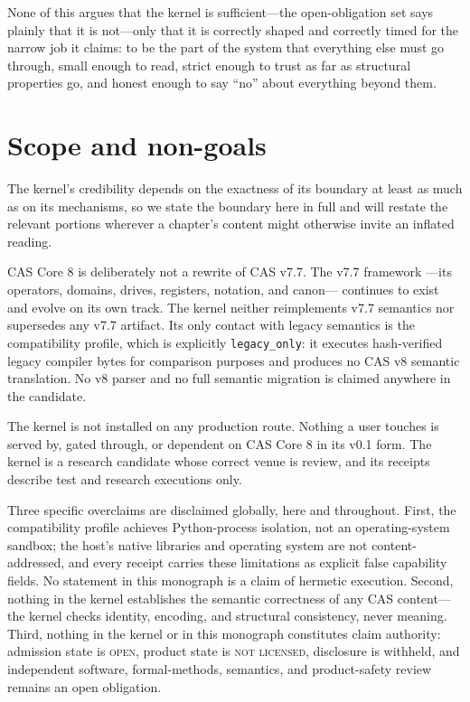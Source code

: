 None of this argues that the kernel is sufficient---the open-obligation
set says plainly that it is not---only that it is correctly shaped and
correctly timed for the narrow job it claims: to be the part of the
system that everything else must go through, small enough to read,
strict enough to trust as far as structural properties go, and honest
enough to say ``no'' about everything beyond them.

\section{Scope and non-goals}\label{ch01:scope}

The kernel's credibility depends on the exactness of its boundary at
least as much as on its mechanisms, so we state the boundary here in
full and will restate the relevant portions wherever a chapter's content
might otherwise invite an inflated reading.

\begin{boundary}\label{ch01:bd-notrewrite}
CAS Core 8 is deliberately not a rewrite of CAS v7.7. The v7.7 framework
---its operators, domains, drives, registers, notation, and canon---
continues to exist and evolve on its own track. The kernel neither
reimplements v7.7 semantics nor supersedes any v7.7 artifact. Its only
contact with legacy semantics is the compatibility profile, which is
explicitly \texttt{legacy\_only}: it executes hash-verified legacy
compiler bytes for comparison purposes and produces no CAS v8 semantic
translation. No v8 parser and no full semantic migration is claimed
anywhere in the candidate.
\end{boundary}

\begin{boundary}\label{ch01:bd-noproduction}
The kernel is not installed on any production route. Nothing a user
touches is served by, gated through, or dependent on CAS Core 8 in its
v0.1 form. The kernel is a research candidate whose correct venue is
review, and its receipts describe test and research executions only.
\end{boundary}

\begin{boundary}\label{ch01:bd-noclaims}
Three specific overclaims are disclaimed globally, here and throughout.
First, the compatibility profile achieves Python-process isolation, not
an operating-system sandbox; the host's native libraries and operating
system are not content-addressed, and every receipt carries these
limitations as explicit false capability fields. No statement in this
monograph is a claim of hermetic execution. Second, nothing in the
kernel establishes the semantic correctness of any CAS content---the
kernel checks identity, encoding, and structural consistency, never
meaning. Third, nothing in the kernel or in this monograph constitutes
claim authority: admission state is \textsc{open}, product state is
\textsc{not licensed}, disclosure is withheld, and independent software,
formal-methods, semantics, and product-safety review remains an open
obligation.
\end{boundary}

